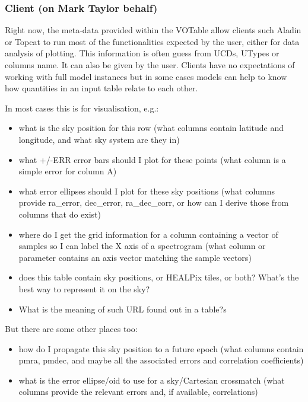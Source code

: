 \documentclass[11pt,a4paper]{ivoa}
\begin{document}
\subsubsection{Client (on Mark Taylor behalf)}
Right now, the meta-data provided within the VOTable allow clients such Aladin or Topcat to run most 
of the functionalities expected by the user, either for data analysis of plotting.
This information is often guess from UCDs, UTypes or columns name. It can also be given by the user.
Clients have no expectations of working with full model instances but in some cases models 
can help to know how quantities in an input table relate to each other.

In most cases this is for visualisation, e.g.:
\begin{itemize}[noitemsep,topsep=0pt,parsep=0pt,partopsep=0pt]
    \item what is the sky position for this row
    (what columns contain latitude and longitude, and what sky system are they in)

     \item what +/-ERR error bars should I plot for these points
    (what column is a simple error for column A)

    \item what error ellipses should I plot for these sky positions
    (what columns provide ra\_error, dec\_error, ra\_dec\_corr,
     or how can I derive those from columns that do exist)

    \item where do I get the grid information for a column containing
    a vector of samples so I can label the X axis of a spectrogram
    (what column or parameter contains an axis vector matching
     the sample vectors)

    \item does this table contain sky positions, or HEALPix tiles, or both?
    What's the best way to represent it on the sky?

    \item What is the meaning of such URL found out in a table?s
\end{itemize}

But there are some other places too:
\begin{itemize}[noitemsep,topsep=0pt,parsep=0pt,partopsep=0pt]
    \item how do I propagate this sky position to a future epoch
    (what columns contain pmra, pmdec, and maybe all the
     associated errors and correlation coefficients)

    \item what is the error ellipse/oid to use for a sky/Cartesian crossmatch
    (what columns provide the relevant errors and, if available,
     correlations)
\end{itemize}
\end{document}
